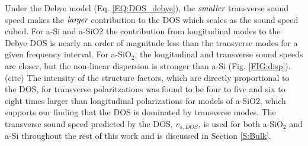 \documentclass[aps,prb,onecolumn,preprint,superscriptaddress,footinbib,amsmath,amssymb,floatfix]{revtex4}
\begin{document}
Under the Debye model (Eq. \eqref{EQ:DOS_debye}), 
the $\emph{smaller}$ transverse sound speed 
makes the $\emph{larger}$ contribution to the DOS which scales 
as the sound speed cubed. For a-Si and a-SiO2  
the contribution from longitudinal modes to the Debye DOS is nearly 
an order of magnitude less than the transverse modes for a given 
frequency interval. For a-SiO$_2$, the longitudinal and 
transverse sound speeds are closer, but the non-linear dispersion 
is stronger than a-Si (Fig. \ref{FIG:disp}).(cite) 
The intensity of the structure factors, which   
are directly proportional to the DOS,
\cite{beltukov_ioffe-regel_2013} for transverse polaritzations was found 
to be four to five\cite{taraskin_phonons_1997} 
and six to eight\cite{horbach_high_2001} times larger than longitudinal 
polarizations for models 
of a-SiO2, which supports our finding that the DOS is dominated 
by transverse modes. 
The transverse sound speed predicted by the DOS, $v_{s,DOS}$, is used for both 
a-SiO$_2$ and a-Si throughout the rest of this work and is discussed 
in Section \ref{S:Bulk}.

\end{document}
